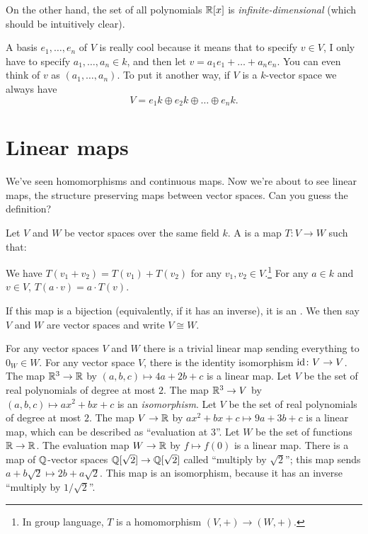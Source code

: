On the other hand, the set of all polynomials
$\mathbb R[x]$ is \emph{infinite-dimensional}
(which should be intuitively clear).

A basis $e_1, \dots, e_n$ of $V$ is really cool
because it means that to specify $v \in V$,
I only have to specify $a_1, \dots, a_n \in k$,
and then let $v = a_1 e_1 + \dots + a_n e_n$.
You can even think of $v$ as $\left( a_1, \dots, a_n \right)$.
To put it another way, if $V$ is a $k$-vector space we always have
\[ V = e_1 k \oplus e_2 k \oplus \dots \oplus e_n k. \]

\section{Linear maps}
\label{sec:vector_space_linear_maps}
We've seen homomorphisms and continuous maps.
Now we're about to see linear maps, the structure preserving maps
between vector spaces. Can you guess the definition?

\begin{definition}
	Let $V$ and $W$ be vector spaces over the same field $k$.
	A  is a map $T \colon V \to W$ such that:
	\begin{enumerate}[(i)]
		\ii We have $T(v_1 + v_2) = T(v_1) + T(v_2)$
		for any $v_1, v_2 \in V$.\footnote{In group language,
			$T$ is a homomorphism $(V,+) \to (W,+)$.}
		\ii For any $a \in k$ and $v \in V$, $T(a \cdot v) = a \cdot T(v)$.
	\end{enumerate}
	If this map is a bijection (equivalently, if it has an inverse),
	it is an .
	We then say $V$ and $W$ are 
	vector spaces and write $V \cong W$.
\end{definition}

\begin{example}
	\listhack
	\begin{enumerate}[(a)]
		\ii For any vector spaces $V$ and $W$ there is a trivial linear map sending everything to $0_W \in W$.
		\ii For any vector space $V$, there is the identity isomorphism $\mathrm{id} \colon V \to V$.
		\ii The map $\mathbb R^3 \to \mathbb R$ by $(a,b,c) \mapsto 4a+2b+c$ is a linear map.
		\ii Let $V$ be the set of real polynomials of degree at most $2$.
		The map $\mathbb R^3 \to V$ by $(a,b,c) \mapsto ax^2+bx+c$ is an \emph{isomorphism}.
		\ii Let $V$ be the set of real polynomials of degree at most $2$.
		The map $V \to \mathbb R$ by $ax^2+bx+c \mapsto 9a + 3b + c$
		is a linear map, which can be described as ``evaluation at $3$''.
		\ii Let $W$ be the set of functions $\mathbb R \to \mathbb R$.
		The evaluation map $W \to \mathbb R$ by $f \mapsto f(0)$ is a linear map.
		\ii There is a map of $\mathbb Q$-vector spaces $\mathbb Q[\sqrt2] \to \mathbb Q[\sqrt2]$
		called ``multiply by $\sqrt2$''; this map sends $a+b\sqrt2 \mapsto 2b + a\sqrt2$.
		This map is an isomorphism, because it has an inverse ``multiply by $1/\sqrt2$''.
	\end{enumerate}
\end{example}

